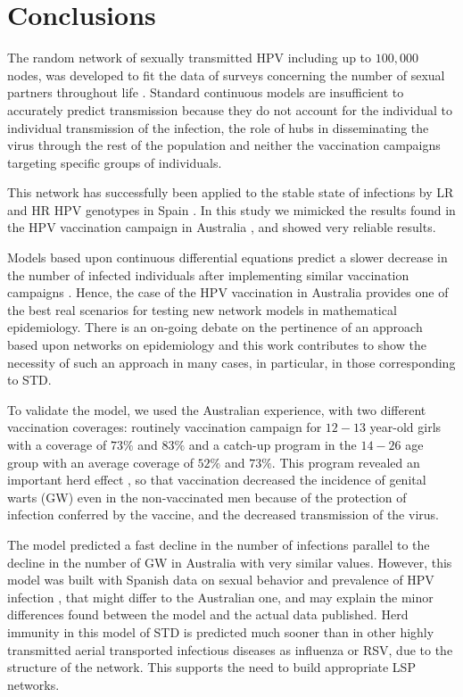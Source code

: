\chapter{Conclusions}
The random network of sexually transmitted HPV including up to $100,000$ nodes, was developed to fit the data of surveys concerning the number of sexual partners throughout life \cite{Acedo2017,DezDomingo2017}. Standard continuous models are insufficient to accurately predict transmission because they do not account for the individual to individual transmission of the infection, the role of hubs in disseminating the virus through the rest of the population and neither the vaccination campaigns targeting specific groups of individuals.

This network has successfully been applied to the stable state of infections by LR and HR HPV genotypes in Spain  \cite{Acedo2017}. In this study we mimicked the results found in the HPV vaccination campaign in Australia \cite{ali2013genital}, and showed very reliable results. 

Models based upon continuous differential equations predict a slower decrease in the number of infected individuals after implementing similar vaccination campaigns \cite{elbasha2007model}. Hence, the case of the HPV vaccination in Australia provides one of the best real scenarios for testing new network models in mathematical epidemiology. There is an on-going debate on the pertinence of an approach based upon networks on epidemiology \cite{Eubank} and this work contributes to show the necessity of such an approach in many cases, in particular, in those corresponding to STD.

To validate the model, we used the Australian experience, with two different vaccination coverages: routinely vaccination campaign for $12-13$ year-old girls with a coverage of $73\%$ and $83\%$ and a catch-up program in the $14-26$ age group with an average coverage of $52\%$ and $73\%$. This program revealed an important herd effect \cite{ali2013genital}, so that vaccination decreased the incidence of genital warts (GW) even in the non-vaccinated men because of the protection of infection conferred by the vaccine, and the decreased transmission of the virus.

The model predicted a fast decline in the number of infections parallel to the decline in the number of GW in Australia with very similar values. However, this model was built with Spanish data on sexual behavior \cite{INE} and prevalence of HPV infection \cite{castellsague2012prevalence}, that might differ to the Australian one, and may explain the minor differences found between the model and the actual data published. Herd immunity in this model of STD is predicted much sooner than in other highly transmitted aerial transported infectious diseases as influenza or RSV, due to the structure of the network. This supports the need to build appropriate LSP networks. 

